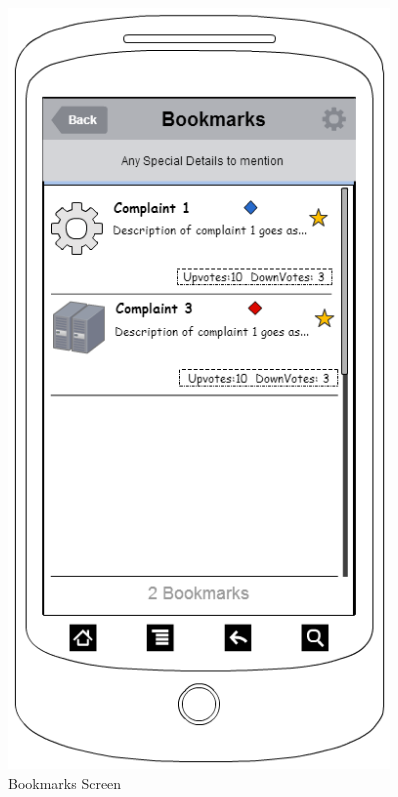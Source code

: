 \documentclass[12pt]{article}
\begin{document}
\begin{figure}[!ht]
\begin{minipage}{.5\textwidth}
        \includegraphics[width=0.9\textwidth]{./appMockUp/bookmarksScreen}
        \caption{Bookmarks Screen}
        \label{fig:bookmarksScreen}
      \end{minipage}

    \end{figure}
    
\end{document}
